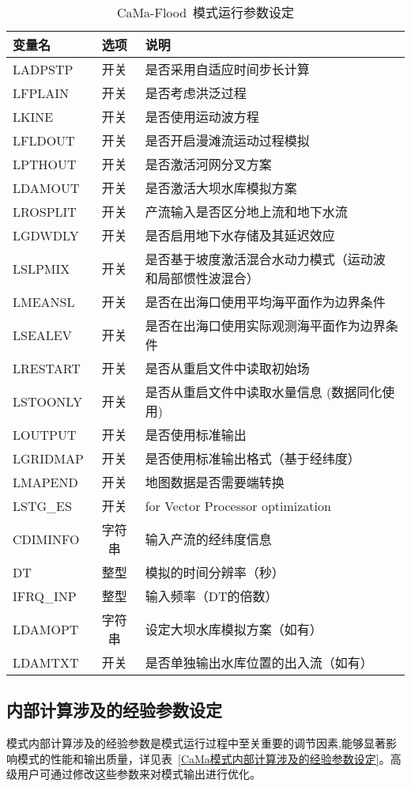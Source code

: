 \begin{table}[htbp]
\caption{CaMa-Flood~模式运行参数设定}
\centering \renewcommand{\arraystretch}{1.5}
\label{模式运行参数设定}
\begin{tabular}{lcl}
\toprule
\textbf{变量名} & \textbf{选项} & \textbf{说明} \\\midrule

LADPSTP & 开关 & 是否采用自适应时间步长计算 \\
LFPLAIN & 开关 & 是否考虑洪泛过程 \\
LKINE & 开关 & 是否使用运动波方程 \\
LFLDOUT & 开关 & 是否开启漫滩流运动过程模拟 \\
LPTHOUT & 开关 & 是否激活河网分叉方案 \\
LDAMOUT & 开关 & 是否激活大坝水库模拟方案 \\
LROSPLIT & 开关 & 产流输入是否区分地上流和地下水流 \\
LGDWDLY & 开关 & 是否启用地下水存储及其延迟效应 \\
LSLPMIX & 开关 &
\makecell[l]{是否基于坡度激活混合水动力模式（运动波\\和局部惯性波混合）} \\
LMEANSL & 开关 & 是否在出海口使用平均海平面作为边界条件 \\
LSEALEV & 开关 & 是否在出海口使用实际观测海平面作为边界条件 \\
LRESTART & 开关 & 是否从重启文件中读取初始场 \\
LSTOONLY & 开关 & 是否从重启文件中读取水量信息 (数据同化使用) \\
LOUTPUT & 开关 & 是否使用标准输出 \\
LGRIDMAP & 开关 & 是否使用标准输出格式（基于经纬度） \\
LMAPEND & 开关 & 地图数据是否需要端转换 \\
LSTG\_ES & 开关 & for Vector Processor optimization \\
CDIMINFO & 字符串 & 输入产流的经纬度信息 \\
DT & 整型 & 模拟的时间分辨率（秒） \\
IFRQ\_INP & 整型 & 输入频率（DT的倍数） \\
LDAMOPT & 字符串 & 设定大坝水库模拟方案（如有） \\
LDAMTXT & 开关 & 是否单独输出水库位置的出入流（如有） \\
\bottomrule
\end{tabular}
\end{table}

\subsection{内部计算涉及的经验参数设定}
模式内部计算涉及的经验参数是模式运行过程中至关重要的调节因素,能够显著影响模式的性能和输出质量，详见表~\ref{CaMa模式内部计算涉及的经验参数设定}。高级用户可通过修改这些参数来对模式输出进行优化。

